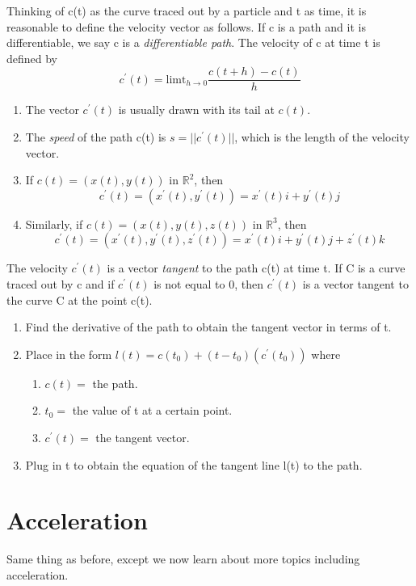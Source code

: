 \documentclass[12pt, letterpaper]{article}
\begin{document}
Thinking of c(t) as the curve traced out by a particle and t as time, it is reasonable to define the velocity vector as follows. If c is a path and it is differentiable, we say 
c is a \textit{differentiable path}. The velocity of c at time t is defined by 
\[
c^{'}(t) = \text{limt}_{h \rightarrow 0}\frac{c(t+h) - c(t)}{h}    
\]
\begin{enumerate}
    \item The vector \(c^{'}(t)\) is usually drawn with its tail at \(c(t)\).
    \item The \textit{speed} of the path c(t) is \(s = ||c^{'}(t)||\), which is the length of the velocity vector.
    \item If \(c(t) = (x(t), y(t))\) in \(\mathbb{R}^2\), then \[c^{'}(t) = (x^{'}(t), y^{'}(t)) = x^{'}(t)i + y^{'}(t)j\]
    \item Similarly, if \(c(t) = (x(t), y(t), z(t))\) in \(\mathbb{R}^3\), then \[c^{'}(t) = (x^{'}(t), y^{'}(t), z^{'}(t)) = x^{'}(t)i + y^{'}(t)j + z^{'}(t)k\]
\end{enumerate} 

The velocity \(c^{'}(t)\) is a vector \textit{tangent} to the path c(t) at time t. If C is a curve traced out by c and if \(c^{'}(t)\) is not equal to 0, then \(c^{'}(t)\) is a vector tangent to the curve C at the point c(t).
\begin{enumerate}
    \item Find the derivative of the path to obtain the tangent vector in terms of t. 
    \item Place in the form \(l(t) = c(t_0) + (t - t_0)(c^{'}(t_0))\) where 
    \begin{enumerate}
        \item \(c(t) = \) the path.
        \item \(t_0 = \) the value of t at a certain point.
        \item \(c^{'}(t) = \) the tangent vector.
    \end{enumerate}
    \item Plug in t to obtain the equation of the tangent line l(t) to the path.
\end{enumerate}

\section{Acceleration}

Same thing as before, except we now learn about more topics including acceleration.
\end{document}

